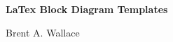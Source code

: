 %
%

\xdef\relpathconfig{}

\xdef\relpathtemplate{}







%
%




%
%
\begin{titlepage}
	
	\begin{center}
		
		{\LARGE{\bf LaTex Block Diagram Templates}} 
		
		\vspace{1cm}
		
		{\LARGE Brent A. Wallace}		
		
	\end{center}
	
	
\end{titlepage}


\thispagestyle{empty}


%
%


%
%


%
%










